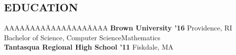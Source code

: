 \documentclass{res}
\begin{document}
\begin{resume}
\myvspace
\section{EDUCATION}     
\myvspace
\begin{tabbing}
AAAA\=AAAA\=AAAA\=AAAA\=AAAA\kill
{\bf Brown University '16} Providence, RI\\
	\>Bachelor of Science, Computer Science\textemdash Mathematics\\
\sbreak
{\bf Tantasqua Regional High School '11} Fiskdale, MA\\%
\end{tabbing}
\sectionVspace %

\end{resume}
\end{document}
